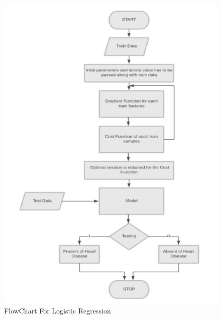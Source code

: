 \documentclass{book}
\begin{document}
    		
    	\begin{figure}
    		\begin{center}
    			\includegraphics[width=14cm]{images/logistic_regression.png}
    			\caption{FlowChart For Logistic Regression}
    		\end{center}
    	\end{figure}
    	
\end{document}
